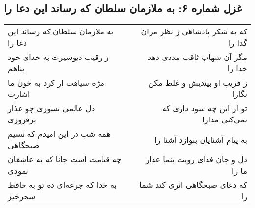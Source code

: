 \begin{center}
\section*{غزل شماره ۶: به ملازمان سلطان که رساند این دعا را}
\label{sec:sh006}
\begin{longtable}{l p{0.5cm} r}
به ملازمان سلطان که رساند این دعا را
&&
که به شکر پادشاهی ز نظر مران گدا را
\\
ز رقیب دیوسیرت به خدای خود پناهم
&&
مگر آن شهاب ثاقب مددی دهد خدا را
\\
مژه سیاهت ار کرد به خون ما اشارت
&&
ز فریب او بیندیش و غلط مکن نگارا
\\
دل عالمی بسوزی چو عذار برفروزی
&&
تو از این چه سود داری که نمی‌کنی مدارا
\\
همه شب در این امیدم که نسیم صبحگاهی
&&
به پیام آشنایان بنوازد آشنا را
\\
چه قیامت است جانا که به عاشقان نمودی
&&
دل و جان فدای رویت بنما عذار ما را
\\
به خدا که جرعه‌ای ده تو به حافظ سحرخیز
&&
که دعای صبحگاهی اثری کند شما را
\\
\end{longtable}
\end{center}
